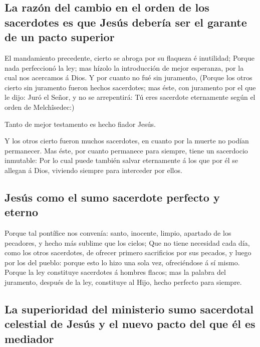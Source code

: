 \hypertarget{la-razuxf3n-del-cambio-en-el-orden-de-los-sacerdotes-es-que-jesuxfas-deberuxeda-ser-el-garante-de-un-pacto-superior}{%
\subsection{La razón del cambio en el orden de los sacerdotes es que
Jesús debería ser el garante de un pacto
superior}\label{la-razuxf3n-del-cambio-en-el-orden-de-los-sacerdotes-es-que-jesuxfas-deberuxeda-ser-el-garante-de-un-pacto-superior}}

 El mandamiento precedente, cierto se abroga por su
flaqueza é inutilidad;  Porque nada perfeccionó la ley;
mas hízolo la introducción de mejor esperanza, por la cual nos acercamos
á Dios.  Y por cuanto no fué sin juramento,
 (Porque los otros cierto sin juramento fueron hechos
sacerdotes; mas éste, con juramento por el que le dijo: Juró el Señor, y
no se arrepentirá: Tú eres sacerdote eternamente según el orden de
Melchîsedec:)

 Tanto de mejor testamento es hecho fiador Jesús.

 Y los otros cierto fueron muchos sacerdotes, en cuanto
por la muerte no podían permanecer.  Mas éste, por cuanto
permanece para siempre, tiene un sacerdocio inmutable: 
Por lo cual puede también salvar eternamente á los que por él se allegan
á Dios, viviendo siempre para interceder por ellos.

\hypertarget{jesuxfas-como-el-sumo-sacerdote-perfecto-y-eterno}{%
\subsection{Jesús como el sumo sacerdote perfecto y
eterno}\label{jesuxfas-como-el-sumo-sacerdote-perfecto-y-eterno}}

 Porque tal pontífice nos convenía: santo, inocente,
limpio, apartado de los pecadores, y hecho más sublime que los cielos;
 Que no tiene necesidad cada día, como los otros
sacerdotes, de ofrecer primero sacrificios por sus pecados, y luego por
los del pueblo: porque esto lo hizo una sola vez, ofreciéndose á sí
mismo.  Porque la ley constituye sacerdotes á hombres
flacos; mas la palabra del juramento, después de la ley, constituye al
Hijo, hecho perfecto para siempre.

\hypertarget{la-superioridad-del-ministerio-sumo-sacerdotal-celestial-de-jesuxfas-y-el-nuevo-pacto-del-que-uxe9l-es-mediador}{%
\subsection{La superioridad del ministerio sumo sacerdotal celestial de
Jesús y el nuevo pacto del que él es
mediador}\label{la-superioridad-del-ministerio-sumo-sacerdotal-celestial-de-jesuxfas-y-el-nuevo-pacto-del-que-uxe9l-es-mediador}}

